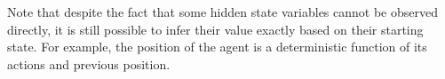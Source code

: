 Note that despite the fact that some hidden state variables cannot be observed directly, it is still possible to infer their value exactly based on their starting state. For example, the position of the agent is a deterministic function of its actions and previous position. %


